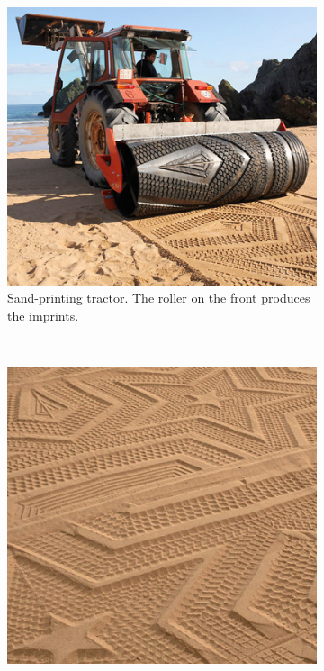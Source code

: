 \label{art review}
    \begin{figure}%
        \centering
        \begin{subfigure}[b]{0.45\textwidth}
            \includegraphics[width=\textwidth]{Files/sand_machine.jpg}
            \caption{Sand-printing tractor. The roller on the front produces the imprints.}
            \label{fig: sand machine}
        \end{subfigure}
        ~
        \begin{subfigure}[b]{0.45\textwidth}
            \includegraphics[width=\textwidth]{Files/sand_machine_art.jpg}

\end{subfigure}
\end{figure}
